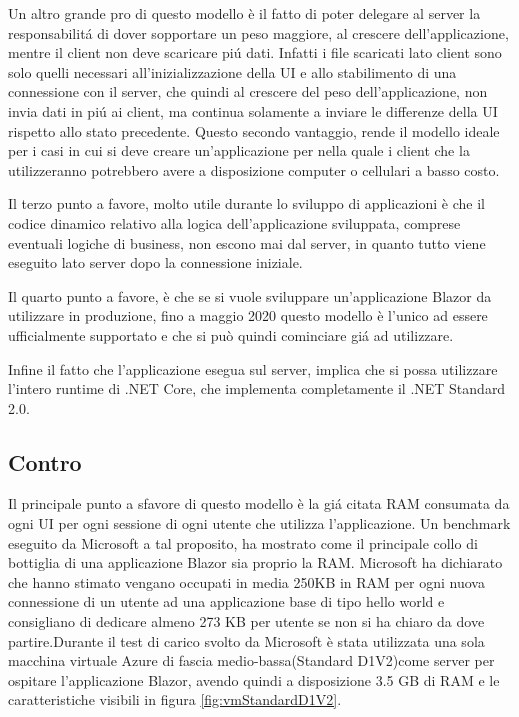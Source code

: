 Un altro grande pro di questo modello \`e il fatto di poter delegare al server la responsabilit\'a di dover sopportare un peso maggiore, al crescere dell'applicazione, mentre il client non deve scaricare pi\'u dati.
Infatti i file scaricati lato client sono solo quelli necessari all'inizializzazione della UI e allo stabilimento di una connessione con il server, che quindi al crescere del peso dell'applicazione, non invia dati in pi\'u ai client, ma continua solamente a inviare le differenze della UI rispetto allo stato precedente.
Questo secondo vantaggio, rende il modello ideale per i casi in cui si deve creare un'applicazione per nella quale i client che la utilizzeranno potrebbero avere a disposizione computer o cellulari a basso costo.

Il terzo punto a favore, molto utile durante lo sviluppo di applicazioni \`e che il codice dinamico relativo alla logica dell'applicazione sviluppata, comprese eventuali logiche di business, non escono mai dal server, in quanto tutto viene eseguito lato server dopo la connessione iniziale.

Il quarto punto a favore, \`e che se si vuole sviluppare un'applicazione Blazor da utilizzare in produzione, fino a maggio 2020 questo modello \`e l'unico ad essere ufficialmente supportato e che si pu\`o quindi cominciare gi\'a ad utilizzare.

Infine il fatto che l'applicazione esegua sul server, implica che si possa utilizzare l'intero runtime di .NET Core, che implementa completamente il .NET Standard 2.0.
\subsection{Contro}\label{sez:controBServer}
Il principale punto a sfavore di questo modello \`e la gi\'a citata RAM consumata da ogni UI per ogni sessione di ogni utente che utilizza l'applicazione.
Un benchmark eseguito da Microsoft a tal proposito, ha mostrato come il principale collo di bottiglia di una applicazione Blazor sia proprio la RAM.
Microsoft ha dichiarato che hanno stimato vengano occupati in media 250KB in RAM per ogni nuova connessione di un utente ad una applicazione base di tipo hello world e consigliano di dedicare almeno 273 KB per utente se non si ha chiaro da dove partire.Durante il test di carico svolto da Microsoft \`e stata utilizzata una sola macchina virtuale Azure di fascia medio-bassa(Standard D1V2)come server per ospitare l'applicazione Blazor, avendo quindi a disposizione 3.5 GB di RAM e le caratteristiche visibili in figura \ref{fig:vmStandardD1V2}.

